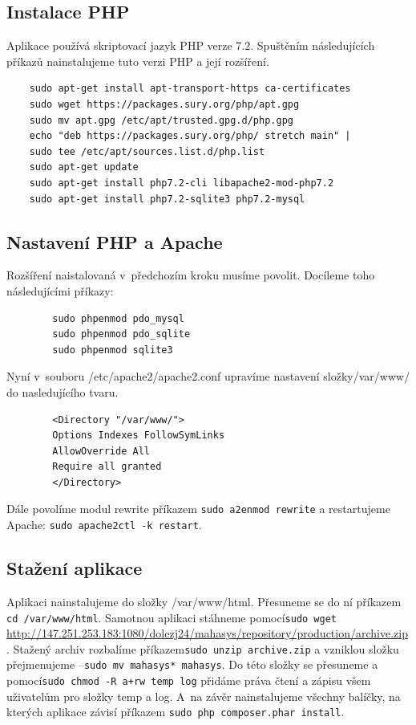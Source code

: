 \documentclass[thesis=B,czech]{FITthesis}[2012/06/26]
\begin{document}
\subsection{Instalace PHP}
	Aplikace používá skriptovací jazyk PHP verze 7.2. Spuštěním následujících příkazů nainstalujeme tuto verzi PHP a její rozšíření.
	\begin{verbatim}
	sudo apt-get install apt-transport-https ca-certificates
	sudo wget https://packages.sury.org/php/apt.gpg
	sudo mv apt.gpg /etc/apt/trusted.gpg.d/php.gpg 
	echo "deb https://packages.sury.org/php/ stretch main" | 
	sudo tee /etc/apt/sources.list.d/php.list
	sudo apt-get update
	sudo apt-get install php7.2-cli libapache2-mod-php7.2
	sudo apt-get install php7.2-sqlite3 php7.2-mysql
	\end{verbatim}
\subsection{Nastavení PHP a Apache}
	Rozšíření naistalovaná v~předchozím kroku musíme povolit. Docíleme toho následujícími příkazy:
	\begin{verbatim}
		sudo phpenmod pdo_mysql
		sudo phpenmod pdo_sqlite
		sudo phpenmod sqlite3
	\end{verbatim}
	Nyní v~souboru /etc/apache2/apache2.conf upravíme nastavení složky\newline/var/www/ do nasledujícího tvaru.
	\begin{verbatim}
		<Directory "/var/www/">
		Options Indexes FollowSymLinks
		AllowOverride All
		Require all granted
		</Directory>
	\end{verbatim}
	Dále povolíme modul rewrite příkazem \verb|sudo a2enmod rewrite| a restartujeme Apache: \verb|sudo apache2ctl -k restart|.
\subsection{Stažení aplikace}
	Aplikaci nainstalujeme do složky /var/www/html. Přesuneme se do ní příkazem \verb|cd /var/www/html|. Samotnou aplikaci stáhneme pomocí\newline\verb|sudo wget | \url{http://147.251.253.183:1080/dolezj24/mahasys/repository/production/archive.zip}. Stažený archiv rozbalíme příkazem\newline\verb|sudo unzip archive.zip| a vzniklou složku přejmenujeme --\newline\verb|sudo mv mahasys* mahasys|. Do této složky se přesuneme a pomocí\newline\verb|sudo chmod -R a+rw temp log| přidáme práva čtení a zápisu všem uživatelům pro složky temp a log. A~na závěr nainstalujeme všechny balíčky, na kterých aplikace závisí příkazem \verb|sudo php composer.phar install|.
\end{document}
